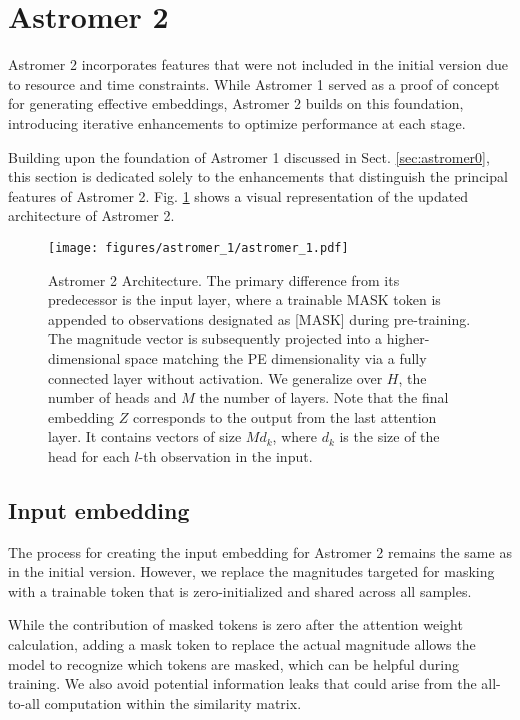 \section{Astromer 2}\label{sec:astromer1}
Astromer 2 incorporates features that were not included in the initial version due to resource and time constraints. While Astromer 1 served as a proof of concept for generating effective embeddings, Astromer 2 builds on this foundation, introducing iterative enhancements to optimize performance at each stage.

Building upon the foundation of Astromer 1 discussed in Sect. \ref{sec:astromer0}, this section is dedicated solely to the enhancements that distinguish the principal features of Astromer 2. Fig. \ref{fig:astromer_1} shows a visual representation of the updated architecture of Astromer 2.


\begin{figure}
    \centering
    \texttt{[image: figures/astromer\_1/astromer\_1.pdf]}
    \caption{Astromer 2 Architecture. The primary difference from its predecessor is the input layer, where a trainable MASK token is appended to observations designated as [MASK] during pre-training. The magnitude vector is subsequently projected into a higher-dimensional space matching the PE dimensionality via a fully connected layer without activation. We generalize over $H$, the number of heads and $M$ the number of layers. Note that the final embedding $Z$ corresponds to the output from the last attention layer. It contains vectors of size $M d_k$, where $d_k$ is the size of the head for each $l$-th observation in the input.}
    \label{fig:astromer_1}
\end{figure}

\subsection{Input embedding}
The process for creating the input embedding for Astromer 2 remains the same as in the initial version. However, we replace the magnitudes targeted for masking with a trainable token that is zero-initialized and shared across all samples.

While the contribution of masked tokens is zero after the attention weight calculation, adding a mask token to replace the actual magnitude allows the model to recognize which tokens are masked, which can be helpful during training. We also avoid potential information leaks that could arise from the all-to-all computation within the similarity matrix.

